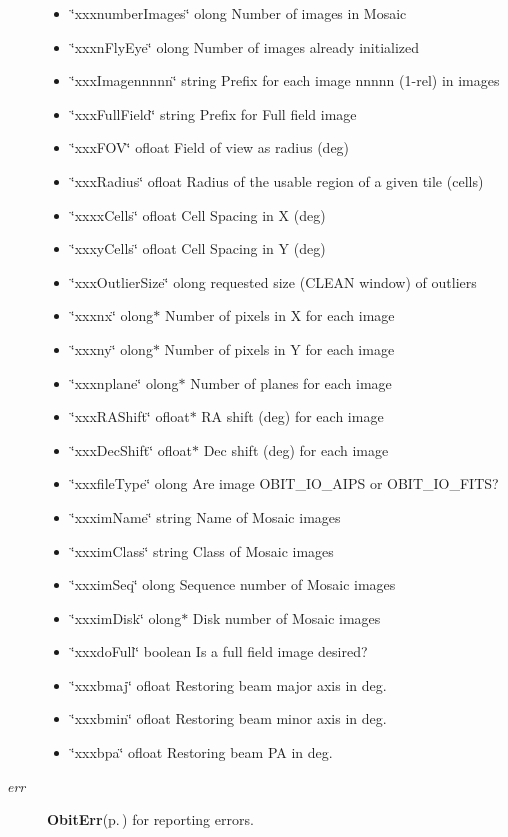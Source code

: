 \begin{Desc}
\begin{description}
\begin{itemize}
\item \char`\"{}xxxnumber\-Images\char`\"{} olong Number of images in Mosaic \item \char`\"{}xxxn\-Fly\-Eye\char`\"{} olong Number of images already initialized \item \char`\"{}xxx\-Imagennnnn\char`\"{} string Prefix for each image nnnnn (1-rel) in images \item \char`\"{}xxx\-Full\-Field\char`\"{} string Prefix for Full field image \item \char`\"{}xxx\-FOV\char`\"{} ofloat Field of view as radius (deg) \item \char`\"{}xxx\-Radius\char`\"{} ofloat Radius of the usable region of a given tile (cells) \item \char`\"{}xxxx\-Cells\char`\"{} ofloat Cell Spacing in X (deg) \item \char`\"{}xxxy\-Cells\char`\"{} ofloat Cell Spacing in Y (deg) \item \char`\"{}xxx\-Outlier\-Size\char`\"{} olong requested size (CLEAN window) of outliers \item \char`\"{}xxxnx\char`\"{} olong$\ast$ Number of pixels in X for each image \item \char`\"{}xxxny\char`\"{} olong$\ast$ Number of pixels in Y for each image \item \char`\"{}xxxnplane\char`\"{} olong$\ast$ Number of planes for each image \item \char`\"{}xxx\-RAShift\char`\"{} ofloat$\ast$ RA shift (deg) for each image \item \char`\"{}xxx\-Dec\-Shift\char`\"{} ofloat$\ast$ Dec shift (deg) for each image \item \char`\"{}xxxfile\-Type\char`\"{} olong Are image OBIT\_\-IO\_\-AIPS or OBIT\_\-IO\_\-FITS? \item \char`\"{}xxxim\-Name\char`\"{} string Name of Mosaic images \item \char`\"{}xxxim\-Class\char`\"{} string Class of Mosaic images \item \char`\"{}xxxim\-Seq\char`\"{} olong Sequence number of Mosaic images \item \char`\"{}xxxim\-Disk\char`\"{} olong$\ast$ Disk number of Mosaic images \item \char`\"{}xxxdo\-Full\char`\"{} boolean Is a full field image desired? \item \char`\"{}xxxbmaj\char`\"{} ofloat Restoring beam major axis in deg. \item \char`\"{}xxxbmin\char`\"{} ofloat Restoring beam minor axis in deg. \item \char`\"{}xxxbpa\char`\"{} ofloat Restoring beam PA in deg. \end{itemize}
\item[{\em err}]{\bf Obit\-Err}{\rm (p.\,\pageref{structObitErr})} for reporting errors. \end{description}
\end{Desc}
